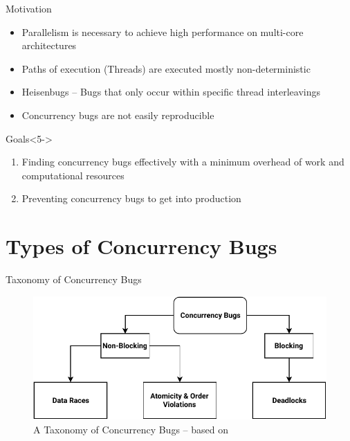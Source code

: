 \documentclass[english,aspectratio=43,t]{beamer}
\begin{document}
\begin{frame}{Motivation}
    \begin{itemize}
        \item<1-> Parallelism is necessary to achieve high performance on multi-core architectures
        \item<2-> Paths of execution (Threads) are executed mostly non-deterministic
        \item<3-> Heisenbugs -- Bugs that only occur within specific thread interleavings
        \item<4-> \Rightarrow{} Concurrency bugs are not easily reproducible
    \end{itemize}
    \begin{exampleblock}{Goals}<5->
        \begin{enumerate}
            \item Finding concurrency bugs effectively with a minimum overhead of work and computational resources
            \item Preventing concurrency bugs to get into production
        \end{enumerate}
    \end{exampleblock}
\end{frame}

\section{Types of Concurrency Bugs}
\frame\sectionpage

\begin{frame}{Taxonomy of Concurrency Bugs}
    \begin{figure}
        \includegraphics[width=\linewidth]{../src/figures/ConcurrencyBugClasses.pdf}
        \caption{A Taxonomy of Concurrency Bugs -- based on\cite{tchamgoue2012testing}}
    \end{figure}
\end{frame}
\end{document}
